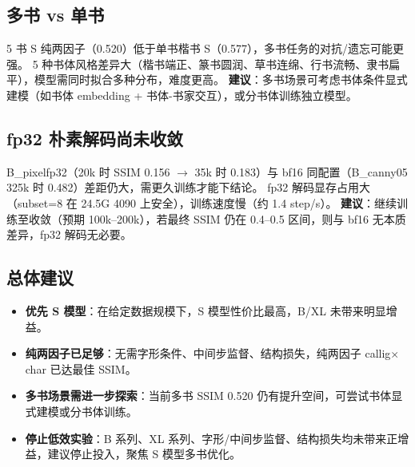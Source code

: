 \documentclass[11pt]{ctexart}
\begin{document}
\subsection{多书 vs 单书}
5 书 S 纯两因子（0.520）低于单书楷书 S（0.577），多书任务的对抗/遗忘可能更强。
5 种书体风格差异大（楷书端正、篆书圆润、草书连绵、行书流畅、隶书扁平），模型需同时拟合多种分布，难度更高。
\textbf{建议}：多书场景可考虑书体条件显式建模（如书体 embedding + 书体-书家交互），或分书体训练独立模型。

\subsection{fp32 朴素解码尚未收敛}
B\_pixelfp32（20k 时 SSIM 0.156 $\to$ 35k 时 0.183）与 bf16 同配置（B\_canny05 325k 时 0.482）差距仍大，需更久训练才能下结论。
fp32 解码显存占用大（subset=8 在 24.5G 4090 上安全），训练速度慢（约 1.4 step/s）。
\textbf{建议}：继续训练至收敛（预期 100k--200k），若最终 SSIM 仍在 0.4--0.5 区间，则与 bf16 无本质差异，fp32 解码无必要。

\subsection{总体建议}
\begin{itemize}
  \item \textbf{优先 S 模型}：在给定数据规模下，S 模型性价比最高，B/XL 未带来明显增益。
  \item \textbf{纯两因子已足够}：无需字形条件、中间步监督、结构损失，纯两因子 callig$\times$char 已达最佳 SSIM。
  \item \textbf{多书场景需进一步探索}：当前多书 SSIM 0.520 仍有提升空间，可尝试书体显式建模或分书体训练。
  \item \textbf{停止低效实验}：B 系列、XL 系列、字形/中间步监督、结构损失均未带来正增益，建议停止投入，聚焦 S 模型多书优化。
\end{itemize}
\end{document}
